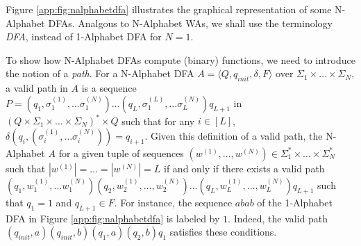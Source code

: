 Figure \ref{app:fig:nalphabetdfa} illustrates the graphical representation of some N-Alphabet DFAs. Analgous to N-Alphabet WAs, we shall use the terminology \textit{DFA}, instead of 1-Alphabet DFA for $N=1$.

To show how N-Alphabet DFAs compute (binary) functions, we need to introduce the notion of a \textit{path}. For a N-Alphabet DFA $A = \langle Q, q_{init}, \delta, F \rangle$ over $\Sigma_{1} \times \ldots \times \Sigma_{N}$, a valid path in $A$ is a sequence $P = (q_{1} ,\sigma_{1}^{(1)}, \ldots \sigma_{1}^{(N)}) \ldots (q_{L} ,\sigma_{1}^{(L)}, \ldots \sigma_{L}^{(N)}) q_{L+1}$ in $ (Q \times \Sigma_{1} \times \ldots \times  \Sigma_{N})^{*} \times Q$ such that for any $i \in [L]$, $\delta(q_{i} ,(\sigma_{i}^{(1)}, \ldots \sigma_{i}^{(N)})) = q_{i+1}$. Given this definition of a valid path, the N-Alphabet $A$ for a given tuple of sequences $(w^{(1)}, \ldots , w^{(N)}) \in \Sigma_{1}^{*} \times \ldots \times \Sigma_{N}^{*}$ such that $|w^{(1)}| = \ldots = |w^{(N)}|= L $ if and only if there exists a valid path  $(q_{1}, w_{1}^{(1)}, \ldots w_{1}^{(N)}) (q_{2}, w_{2}^{(1)}, \ldots , w_{2}^{(N)}) \ldots (q_{L}, w_{L}^{(1)}, \ldots, w_{L}^{(N)}) q_{L+1}$ such that $q_{1} = 1$ and $q_{L+1} \in F$. For instance, the sequence $abab$ of the 1-Alphabet DFA in Figure \ref{app:fig:nalphabetdfa} is labeled by $1$. Indeed, the valid path $(q_{init}, a) (q_{init},b)(q_{1},a)(q_{2},b)q_{1}$ satisfies these conditions.

